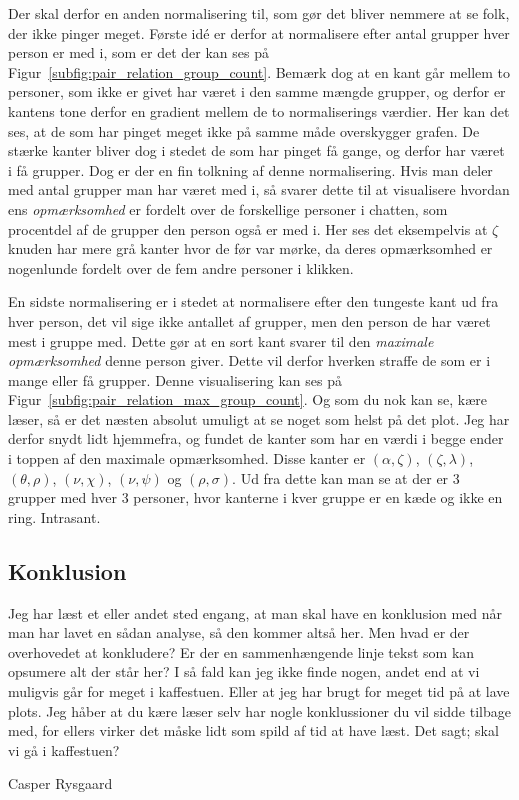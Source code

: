 \begin{article}
Der skal derfor en anden normalisering til, som gør det bliver nemmere at se folk, der ikke pinger meget. Første idé er derfor at normalisere efter antal grupper hver person er med i, som er det der kan ses på Figur~\ref{subfig:pair_relation_group_count}. Bemærk dog at en kant går mellem to personer, som ikke er givet har været i den samme mængde grupper, og derfor er kantens tone derfor en gradient mellem de to normaliserings værdier. Her kan det ses, at de som har pinget meget ikke på samme måde overskygger grafen. De stærke kanter bliver dog i stedet de som har pinget få gange, og derfor har været i få grupper. Dog er der en fin tolkning af denne normalisering. Hvis man deler med antal grupper man har været med i, så svarer dette til at visualisere hvordan ens \emph{opmærksomhed} er fordelt over de forskellige personer i chatten, som procentdel af de grupper den person også er med i. Her ses det eksempelvis at $\zeta$ knuden har mere grå kanter hvor de før var mørke, da deres opmærksomhed er nogenlunde fordelt over de fem andre personer i klikken.

En sidste normalisering er i stedet at normalisere efter den tungeste kant ud fra hver person, det vil sige ikke antallet af grupper, men den person de har været mest i gruppe med. Dette gør at en sort kant svarer til den \emph{maximale opmærksomhed} denne person giver. Dette vil derfor hverken straffe de som er i mange eller få grupper. Denne visualisering kan ses på Figur~\ref{subfig:pair_relation_max_group_count}. Og som du nok kan se, kære læser, så er det næsten absolut umuligt at se noget som helst på det plot. Jeg har derfor snydt lidt hjemmefra, og fundet de kanter som har en værdi i begge ender i toppen af den maximale opmærksomhed. Disse kanter er $(\alpha, \zeta)$, $(\zeta, \lambda)$, $(\theta, \rho)$, $(\nu, \chi)$, $(\nu, \psi)$ og $(\rho, \sigma)$. Ud fra dette kan man se at der er 3 grupper med hver 3 personer, hvor kanterne i kver gruppe er en kæde og ikke en ring. Intrasant.


\subsection*{Konklusion}

Jeg har læst et eller andet sted engang, at man skal have en konklusion med når man har lavet en sådan analyse, så den kommer altså her.
Men hvad er der overhovedet at konkludere? Er der en sammenhængende linje tekst som kan opsumere alt der står her?
I så fald kan jeg ikke finde nogen, andet end at vi muligvis går for meget i kaffestuen. Eller at jeg har brugt for meget tid på at lave plots.
Jeg håber at du kære læser selv har nogle konklussioner du vil sidde tilbage med, for ellers virker det måske lidt som spild af tid at have læst.
Det sagt; skal vi gå i kaffestuen? \coffee\


\end{article}

\begin{flushright}
Casper Rysgaard
\end{flushright}
